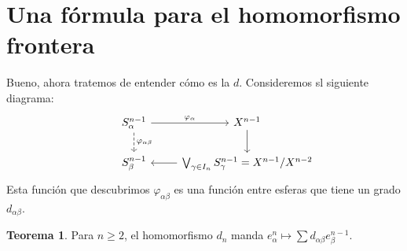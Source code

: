 \documentclass[spanish]{book}
\theoremstyle{definition}
\newtheorem*{teo}{Teorema}
\begin{document}
\section{Una fórmula para el homomorfismo frontera}
	Bueno, ahora tratemos de entender cómo es la $d$. Consideremos sl siguiente diagrama:
	\[\begin{tikzcd}
		& S^{n-1}_\alpha \arrow[r, "\varphi_\alpha"] \arrow[d, dashed, "\varphi_{\alpha\beta}"] & X^{n-1} \arrow[d] \\
		& S^{n-1}_\beta & \bigvee_{\gamma\in I_n}S^{n-1}_\gamma = X^{n-1}/X^{n-2} \arrow[l]
	\end{tikzcd}\]
	Esta función que descubrimos $\varphi_{\alpha\beta}$ es una función entre esferas que tiene un grado $d_{\alpha\beta}$.
	\begin{teo}
		Para $n\geq 2$, el homomorfismo $d_n$ manda $e^{n}_\alpha\mapsto\sum d_{\alpha\beta}e^{n-1}_\beta$.
	\end{teo}
\end{document}
